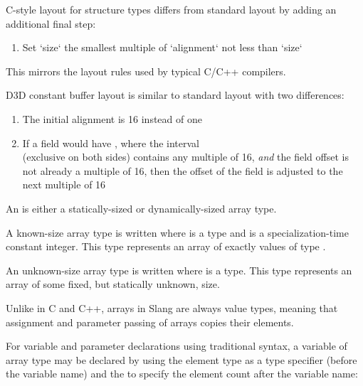 
C-style layout for structure types differs from standard layout by adding an additional final step:

\begin{enumerate}
  \item {Set `size` the smallest multiple of `alignment` not less than `size`} 
\end{enumerate}

This mirrors the layout rules used by typical C/C++ compilers.


D3D constant buffer layout is similar to standard layout with two differences:

\begin{enumerate}
\item{The initial alignment is 16 instead of one}
\item{If a field would have , where the interval \\
 (exclusive on both sides) contains any multiple of 16, \emph{and} the field offset is not already a multiple of 16, then the offset of the field is adjusted to the next multiple of 16}
\end{enumerate}


An  is either a statically-sized or dynamically-sized array type.

A known-size array type is written  where  is a type and  is a specialization-time constant integer.
This type represents an array of exactly  values of type .

An unknown-size array type is written  where  is a type.
This type represents an array of some fixed, but statically unknown, size.

\begin{Note}
Unlike in C and C++, arrays in Slang are always value types, meaning that assignment and parameter passing of arrays copies their elements.
\end{Note}


For variable and parameter declarations using traditional syntax, a variable of array type may be declared by using the element type  as a type specifier (before the variable name) and the \Char{[N]} to specify the element count after the variable name:

